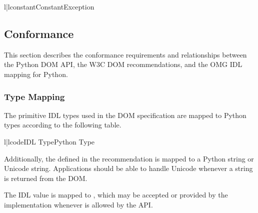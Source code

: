 \begin{tableii}{l|l}{constant}{Constant}{Exception}
\end{tableii}


\subsection{Conformance \label{dom-conformance}}

This section describes the conformance requirements and relationships
between the Python DOM API, the W3C DOM recommendations, and the OMG
IDL mapping for Python.


\subsubsection{Type Mapping \label{dom-type-mapping}}

The primitive IDL types used in the DOM specification are mapped to
Python types according to the following table.

\begin{tableii}{l|l}{code}{IDL Type}{Python Type}
\end{tableii}

Additionally, the  defined in the recommendation is
mapped to a Python string or Unicode string.  Applications should
be able to handle Unicode whenever a string is returned from the DOM.

The IDL  value is mapped to , which may be
accepted or provided by the implementation whenever  is
allowed by the API.


